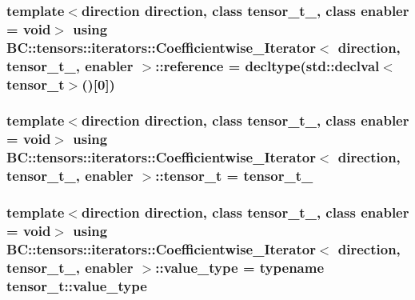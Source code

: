 \subsubsection[{\texorpdfstring{reference}{reference}}]{\setlength{\rightskip}{0pt plus 5cm}template$<$direction direction, class tensor\+\_\+t\+\_\+, class enabler = void$>$ using {\bf B\+C\+::tensors\+::iterators\+::\+Coefficientwise\+\_\+\+Iterator}$<$ {\bf direction}, tensor\+\_\+t\+\_\+, enabler $>$\+::{\bf reference} =  decltype(std\+::declval$<${\bf tensor\+\_\+t}$>$()\mbox{[}0\mbox{]})}\hypertarget{structBC_1_1tensors_1_1iterators_1_1Coefficientwise__Iterator_a98b19a44326b9b99192878436b443e8c}{}\label{structBC_1_1tensors_1_1iterators_1_1Coefficientwise__Iterator_a98b19a44326b9b99192878436b443e8c}
\subsubsection[{\texorpdfstring{tensor\+\_\+t}{tensor_t}}]{\setlength{\rightskip}{0pt plus 5cm}template$<$direction direction, class tensor\+\_\+t\+\_\+, class enabler = void$>$ using {\bf B\+C\+::tensors\+::iterators\+::\+Coefficientwise\+\_\+\+Iterator}$<$ {\bf direction}, tensor\+\_\+t\+\_\+, enabler $>$\+::{\bf tensor\+\_\+t} =  tensor\+\_\+t\+\_\+}\hypertarget{structBC_1_1tensors_1_1iterators_1_1Coefficientwise__Iterator_a9274edbb77b7745545324238ef50c648}{}\label{structBC_1_1tensors_1_1iterators_1_1Coefficientwise__Iterator_a9274edbb77b7745545324238ef50c648}
\subsubsection[{\texorpdfstring{value\+\_\+type}{value_type}}]{\setlength{\rightskip}{0pt plus 5cm}template$<$direction direction, class tensor\+\_\+t\+\_\+, class enabler = void$>$ using {\bf B\+C\+::tensors\+::iterators\+::\+Coefficientwise\+\_\+\+Iterator}$<$ {\bf direction}, tensor\+\_\+t\+\_\+, enabler $>$\+::{\bf value\+\_\+type} =  typename tensor\+\_\+t\+::value\+\_\+type}\hypertarget{structBC_1_1tensors_1_1iterators_1_1Coefficientwise__Iterator_a24bc25cd44f7fe6dd510619e977c89ad}{}\label{structBC_1_1tensors_1_1iterators_1_1Coefficientwise__Iterator_a24bc25cd44f7fe6dd510619e977c89ad}


